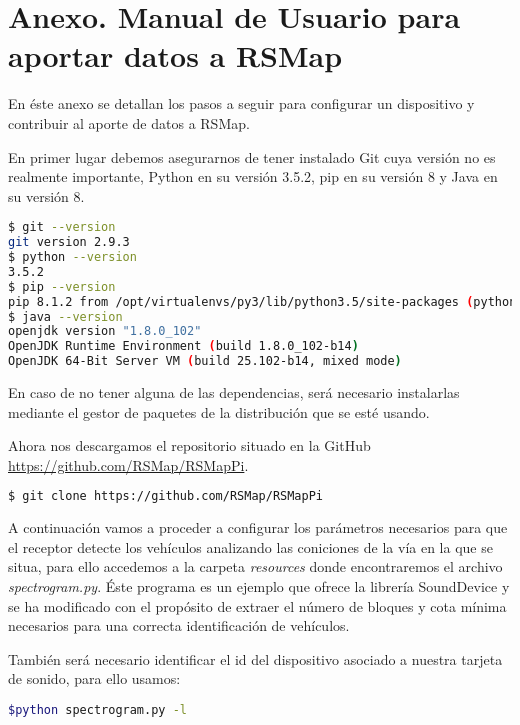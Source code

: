 \chapter*{Anexo. Manual de Usuario para aportar datos a RSMap}

En éste anexo se detallan los pasos a seguir para configurar un dispositivo y contribuir al aporte de datos a RSMap.

\bigskip

En primer lugar debemos asegurarnos de tener instalado Git cuya versión no es realmente importante, Python en su versión 3.5.2, pip en su versión 8 y Java en su versión 8.

\begin{lstlisting}[language=bash,caption={Versiones requeridas},label={lst:pi1}]
$ git --version
git version 2.9.3
$ python --version
3.5.2
$ pip --version
pip 8.1.2 from /opt/virtualenvs/py3/lib/python3.5/site-packages (python 3.5)
$ java --version
openjdk version "1.8.0_102"
OpenJDK Runtime Environment (build 1.8.0_102-b14)
OpenJDK 64-Bit Server VM (build 25.102-b14, mixed mode)
\end{lstlisting}

En caso de no tener alguna de las dependencias, será necesario instalarlas mediante el gestor de paquetes de la distribución que se esté usando.

Ahora nos descargamos el repositorio situado en la GitHub \url{https://github.com/RSMap/RSMapPi}.

\begin{lstlisting}[language=bash,caption={Descarga de repositorio},label={lst:pi1}]
$ git clone https://github.com/RSMap/RSMapPi
\end{lstlisting}

A continuación vamos a proceder a configurar los parámetros necesarios para que el receptor detecte los vehículos analizando las coniciones de la vía en la que se situa, para ello accedemos a la carpeta \textit{resources} donde encontraremos el archivo \textit{spectrogram.py}. Éste programa es un ejemplo que ofrece la librería SoundDevice y se ha modificado con el propósito de extraer el número de bloques y cota mínima necesarios para una correcta identificación de vehículos.

También será necesario identificar el id del dispositivo asociado a nuestra tarjeta de sonido, para ello usamos:

\begin{lstlisting}[language=bash,caption={Obtener los dispositivos de audio conectados},label={lst:pi1}]
$python spectrogram.py -l
\end{lstlisting}


